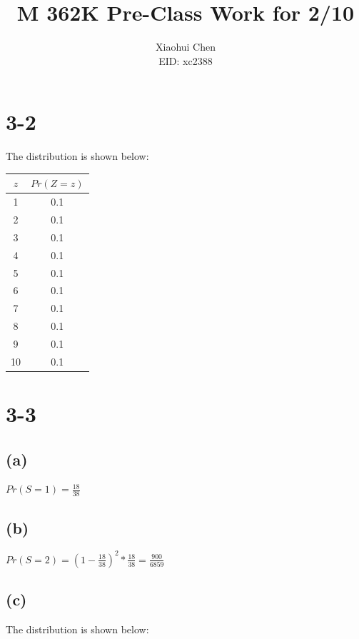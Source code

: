 \documentclass[12pt]{article}
\author{Xiaohui Chen \\EID: xc2388}
\title{M 362K Pre-Class Work for 2/10}
\begin{document}
\maketitle
\begin{spacing}{2.0}

\section*{3-2}

The distribution is shown below:

\begin{tabular}{|c|c|}
  \hline
  $z$ & $Pr(Z=z)$ \\
  \hline
  1 & 0.1 \\
  \hline
  2 & 0.1 \\
  \hline
  3 & 0.1 \\
  \hline
  4 & 0.1 \\
  \hline
  5 & 0.1 \\
  \hline
  6 & 0.1 \\
  \hline
  7 & 0.1 \\
  \hline
  8 & 0.1 \\
  \hline
  9 & 0.1 \\
  \hline
  10 & 0.1 \\
  \hline
\end{tabular}

\section*{3-3}

\subsection*{(a)}

$Pr(S=1)=\frac{18}{38}$

\subsection*{(b)}

$Pr(S=2)=\left(1-\frac{18}{38}\right)^2*\frac{18}{38}= \frac{900}{6859}$

\subsection*{(c)}
The distribution is shown below:


\end{spacing}
\end{document}
